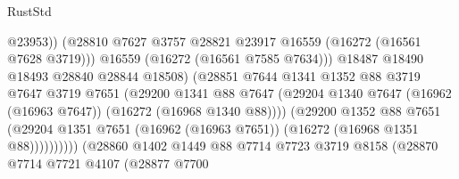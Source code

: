 \begin{lexlean}{RustStd}
\begin{coremodule}
                                            @23953))
                                        (@28810
                                          @7627
                                          @3757
                                          @28821
                                          @23917
                                          @16559
                                          (@16272 (@16561 @7628 @3719)))
                                        @16559
                                        (@16272 (@16561 @7585 @7634)))
                                      @18487
                                      @18490
                                      @18493
                                      @28840
                                      @28844
                                      @18508)
                                    (@28851
                                      @7644
                                      @1341
                                      @1352
                                      @88
                                      @3719
                                      @7647
                                      @3719
                                      @7651
                                      (@29200
                                        @1341
                                        @88
                                        @7647
                                        (@29204
                                          @1340
                                          @7647
                                          (@16962 (@16963 @7647))
                                          (@16272 (@16968 @1340 @88))))
                                      (@29200
                                        @1352
                                        @88
                                        @7651
                                        (@29204
                                          @1351
                                          @7651
                                          (@16962 (@16963 @7651))
                                          (@16272 (@16968 @1351 @88))))))))))
                          (@28860
                            @1402
                            @1449
                            @88
                            @7714
                            @7723
                            @3719
                            @8158
                            (@28870
                              @7714
                              @7721
                              @4107
                              (@28877
                                @7700

\end{coremodule}
\end{lexlean}
